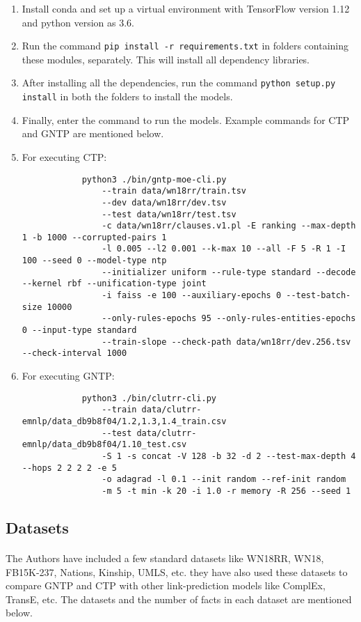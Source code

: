 \documentclass[Other]{iitddiss}
\begin{document}
\begin{enumerate}
	\item Install conda and set up a virtual environment with TensorFlow version 1.12 and python version as 3.6.
	\item Run the command \verb|pip install -r requirements.txt| in folders containing these modules, separately. This will install all dependency libraries.
	\item After installing all the dependencies, run the command \verb|python setup.py install| in both the folders to install the models.
	\item Finally, enter the command to run the models. Example commands for CTP and GNTP are mentioned below.
	\item For executing CTP: 
		\begin{verbatim}
			python3 ./bin/gntp-moe-cli.py
			    --train data/wn18rr/train.tsv 
			    --dev data/wn18rr/dev.tsv
			    --test data/wn18rr/test.tsv
			    -c data/wn18rr/clauses.v1.pl -E ranking --max-depth 1 -b 1000 --corrupted-pairs 1
			    -l 0.005 --l2 0.001 --k-max 10 --all -F 5 -R 1 -I 100 --seed 0 --model-type ntp
			    --initializer uniform --rule-type standard --decode --kernel rbf --unification-type joint
			    -i faiss -e 100 --auxiliary-epochs 0 --test-batch-size 10000
			    --only-rules-epochs 95 --only-rules-entities-epochs 0 --input-type standard
			    --train-slope --check-path data/wn18rr/dev.256.tsv --check-interval 1000
		\end{verbatim}
		\newpage
	\item For executing GNTP:
		\begin{verbatim}
			python3 ./bin/clutrr-cli.py 
				--train data/clutrr-emnlp/data_db9b8f04/1.2,1.3,1.4_train.csv 
				--test data/clutrr-emnlp/data_db9b8f04/1.10_test.csv  
				-S 1 -s concat -V 128 -b 32 -d 2 --test-max-depth 4 --hops 2 2 2 2 -e 5 
				-o adagrad -l 0.1 --init random --ref-init random 
				-m 5 -t min -k 20 -i 1.0 -r memory -R 256 --seed 1
		\end{verbatim}
\end{enumerate}

\subsection{Datasets}
\paragraph{} 
The Authors have included a few standard datasets like WN18RR, WN18, FB15K-237, Nations, Kinship, UMLS, etc. they have also used these datasets to compare GNTP and CTP with other link-prediction models like ComplEx, TransE, etc. The datasets and the number of facts in each dataset are mentioned below. 
\end{document}
